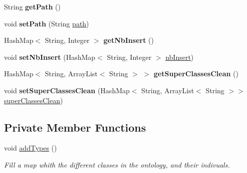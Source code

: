 \begin{DoxyCompactItemize}
\item 
\hypertarget{class_data_base_1_1_individuals_a895ca7042d491b215df19a5b98353c33}{
String {\bfseries getPath} ()}
\label{class_data_base_1_1_individuals_a895ca7042d491b215df19a5b98353c33}

\item 
\hypertarget{class_data_base_1_1_individuals_a4c73984d8c9ff63b83cb96d4f9c39899}{
void {\bfseries setPath} (String \hyperlink{class_data_base_1_1_individuals_a9d3ee042e0b9f2f2889ed6258a9b4e62}{path})}
\label{class_data_base_1_1_individuals_a4c73984d8c9ff63b83cb96d4f9c39899}

\item 
\hypertarget{class_data_base_1_1_individuals_a3c28044db81a3ee2666888b0cfb235c1}{
HashMap$<$ String, Integer $>$ {\bfseries getNbInsert} ()}
\label{class_data_base_1_1_individuals_a3c28044db81a3ee2666888b0cfb235c1}

\item 
\hypertarget{class_data_base_1_1_individuals_a14ecd591a539ebb92a0b530d39c922d7}{
void {\bfseries setNbInsert} (HashMap$<$ String, Integer $>$ \hyperlink{class_data_base_1_1_individuals_af8121a67fea7d2d61877cdcc3f5143aa}{nbInsert})}
\label{class_data_base_1_1_individuals_a14ecd591a539ebb92a0b530d39c922d7}

\item 
\hypertarget{class_data_base_1_1_individuals_a9b49e15d7575f9223e3fa14b6f3fc453}{
HashMap$<$ String, ArrayList$<$ String $>$ $>$ {\bfseries getSuperClassesClean} ()}
\label{class_data_base_1_1_individuals_a9b49e15d7575f9223e3fa14b6f3fc453}

\item 
\hypertarget{class_data_base_1_1_individuals_a8032bc7e0ce40baa9842a31d89f90449}{
void {\bfseries setSuperClassesClean} (HashMap$<$ String, ArrayList$<$ String $>$$>$ \hyperlink{class_data_base_1_1_individuals_ab96b206dfc1f13a8b96512de40215643}{superClassesClean})}
\label{class_data_base_1_1_individuals_a8032bc7e0ce40baa9842a31d89f90449}

\end{DoxyCompactItemize}
\subsection*{Private Member Functions}
\begin{DoxyCompactItemize}
\item 
void \hyperlink{class_data_base_1_1_individuals_ac64452335dc7967bc2d536a690c669f6}{addTypes} ()
\begin{DoxyCompactList}\small\item\em Fill a map whith the different classes in the ontology, and their indivuals. \end{DoxyCompactList}\end{DoxyCompactItemize}
